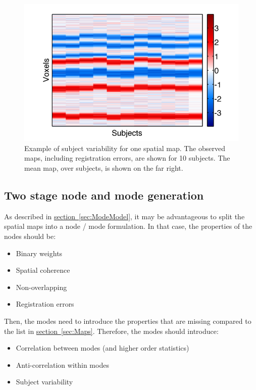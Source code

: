 \documentclass[a4paper, 12pt]{article}
\makeatletter
\newcommand*{\Ref}[2][]{\hyperref[#2]{#1~\ref*{#2}}}
\def\maxwidth{%
 \ifdim\Gin@nat@width>\linewidth
  \linewidth
 \else
  \Gin@nat@width
 \fi
}
\makeatother
\begin{document}
\begin{figure}[htb]
\centering
\includegraphics[width=0.9\maxwidth]{Figures/SubjectMaps.png}
\caption{Example of subject variability for one spatial map. The observed maps, including registration errors, are shown for 10 subjects. The mean map, over subjects, is shown on the far right.}
\label{fig:SubjectMaps}
\end{figure}

\subsection{Two stage node and mode generation}
As described in \Ref[section]{sec:ModeModel}, it may be advantageous to split the spatial maps into a node / mode formulation.
In that case, the properties of the nodes should be:
\begin{itemize}
\item{Binary weights}
\item{Spatial coherence}
\item{Non-overlapping}
\item{Registration errors}
\end{itemize}

Then, the modes need to introduce the properties that are missing compared to the list in \Ref[section]{sec:Maps}.
Therefore, the modes should introduce:
\begin{itemize}
\item{Correlation between modes (and higher order statistics)}
\item{Anti-correlation within modes}
\item{Subject variability}
\end{itemize}
\end{document}
